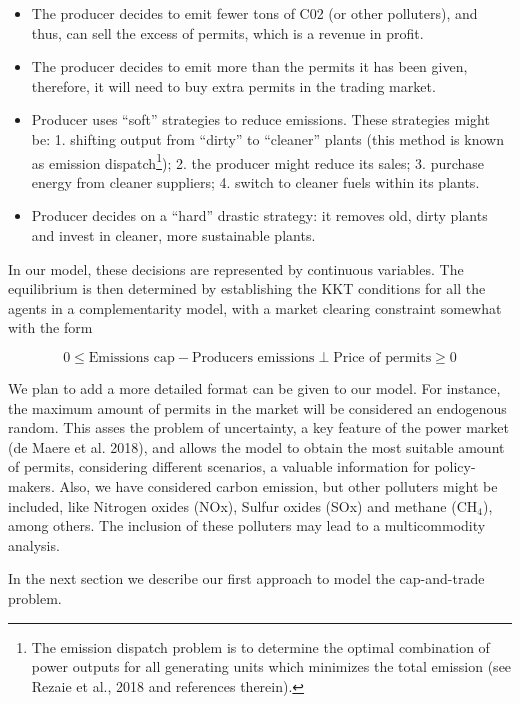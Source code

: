 \documentclass[11pt, letterpaper]{article}
\begin{document}
\begin{itemize}
    \item[1.] The producer decides to emit fewer tons of C02 (or other polluters), and thus, can sell the excess of permits, which is a revenue in profit. 
    
    \item[2.] The producer decides to emit more than the permits it has been given, therefore, it will need to buy extra permits in the trading market. 
    
    \item[3.] Producer uses ``soft'' strategies to reduce emissions. These strategies might be: 1. shifting output from ``dirty'' to ``cleaner'' plants (this method is known as emission dispatch\footnote{The emission dispatch problem is to determine the optimal combination of power outputs for all generating units which  minimizes the total emission (see Rezaie et al., 2018 and references therein).}); 2. the producer might reduce its sales; 3. purchase energy from cleaner suppliers; 4. switch to cleaner fuels within its plants.

    \item[4.] Producer decides on a ``hard''  drastic strategy: it removes old, dirty plants and invest in cleaner, more sustainable plants.
\end{itemize}

In our model, these decisions are represented by continuous variables. The equilibrium is then determined by establishing the KKT conditions for all the agents in a complementarity model, with a market clearing constraint somewhat with the form 

\[ 0 \leq \textrm{Emissions cap} - \textrm{Producers emissions} \perp \textrm{Price of permits} \geq 0 \]

We plan to add a more detailed format can be given to our model. For instance, the maximum amount of permits in the market will be considered an endogenous random. This asses the problem of uncertainty, a key feature of the power market (de Maere et al. 2018), and allows the model to obtain the most suitable amount of permits, considering different scenarios, a valuable information for policy-makers. Also, we have considered carbon emission, but other polluters might be included, like Nitrogen oxides (NOx), Sulfur oxides (SOx) and methane (CH$_{4}$), among others. The inclusion of these polluters may lead to a multicommodity analysis.  

In the next section we describe our first approach to model the cap-and-trade problem.
\end{document}
